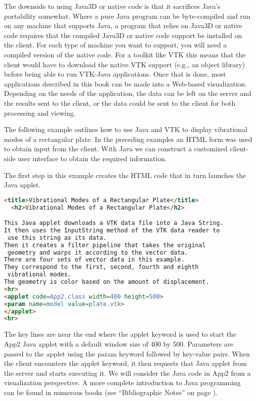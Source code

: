 The downside to using Java3D or native code is that it sacrifices Java's portability somewhat. Where a pure Java program can be byte-compiled and run on any machine that supports Java, a program that relies on Java3D or native code requires that the compiled Java3D or native code support be installed on the client. For each type of machine you want to support, you will need a compiled version of the native code. For a toolkit like VTK this means that the client would have to download the native VTK support (e.g., an object library) before being able to run VTK-Java applications. Once that is done, most applications described in this book can be made into a Web-based visualization. Depending on the needs of the application, the data can be left on the server and the results sent to the client, or the data could be sent to the client for both processing and viewing.

The following example outlines how to use Java and VTK to display vibrational modes of a rectangular plate. In the preceding examples an HTML form was used to obtain input from the client. With Java we can construct a customized client-side user interface to obtain the required information.

The first step in this example creates the HTML code that in turn launches the Java applet.

\begin{lstlisting}[language=HTML, caption={}, numbers=none, frame=none]
<title>Vibrational Modes of a Rectangular Plate</title>
  <h2>Vibrational Modes of a Rectangular Plate</h2>

This Java applet downloads a VTK data file into a Java String.
It then uses the InputString method of the VTK data reader to
 use this string as its data.
Then it creates a filter pipeline that takes the original
 geometry and warps it according to the vector data.
There are four sets of vector data in this example.
They correspond to the first, second, fourth and eighth
 vibrational modes.
The geometry is color based on the amount of displacement.
<hr>
<applet code=App2.class width=400 height=500>
<param name=model value=plate.vtk>
</applet>
<hr>
\end{lstlisting}

The key lines are near the end where the applet keyword is used to start the App2 Java applet with a default window size of 400 by 500. Parameters are passed to the applet using the param keyword followed by key-value pairs. When the client encounters the applet keyword, it then requests that Java applet from the server and starts executing it. We will consider the Java code in App2 from a visualization perspective. A more complete introduction to Java programming can be found in numerous books (see ``Bibliographic Notes'' on page \pageref{sec:ch11.bibliographic_notes}).

